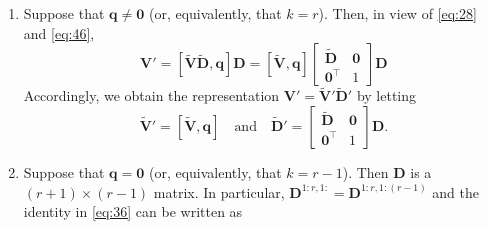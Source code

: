 \documentclass[11pt,a4paper]{article}
\theoremstyle{break}
\numberwithin{dummy}{section}
\theoremstyle{plain}
\theoremstyle{plain}
\theoremstyle{plain}
\theoremstyle{plain}
\theoremstyle{plain}
\theoremstyle{MyNonumberplain}
\newcommand{\0}{\M{0}}
\newcommand{\M}[1]{\mathbf{#1}}
\newcommand{\Mt}[1]{\tilde{\M{#1}}}
\newcommand{\T}{\top}
\newcommand{\ve}[1]{\mathbf{#1}}
\begin{document}
\begin{enumerate}[font=\upshape,label=(\roman*),wide,align=right]
\item Suppose that $\ve{q} \neq \0$ (or, equivalently, that $k=r$).  Then,
  in view of \eqref{eq:28} and \eqref{eq:46},
  \begin{displaymath}
    \M{V}'
    =
    [\Mt{V} \Mt{D}, \ve{q}] \M{D}
    =
     [\Mt{V}, \ve{q}] 
    \begin{bmatrix}
      \Mt{D} & \0
      \\
      \0^\T & 1
    \end{bmatrix}
    \M{D}
  \end{displaymath}
%
%   
%
%
Accordingly, we obtain the representation
\begin{math}
  \M{V}' = \Mt{V}' \Mt{D}'
\end{math}
by letting
\begin{displaymath}
  \Mt{V}' = [\Mt{V}, \ve{q}]
  \quad
  \text{and}
  \quad
  \Mt{D}' =
  \begin{bmatrix}
    \Mt{D} & \0
    \\
    \0^\T & 1
  \end{bmatrix}
  \M{D}.
\end{displaymath}
\item Suppose that $\ve{q} = \0$ (or, equivalently, that $k = r-1$).  Then $\M{D}$ is a $(r+1) \times (r-1)$ matrix. In particular, $\M{D}^{1:r,1:} = \M{D}^{1:r,1:(r-1)}$ and the identity in \eqref{eq:36} can be written as
  \begin{displaymath}

\end{displaymath}
\end{enumerate}
\end{document}
